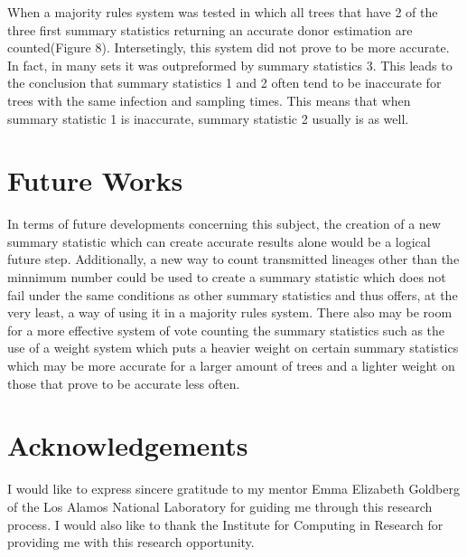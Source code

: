 \documentclass[final,5p,times,twocolumn,authoryear]{elsarticle}
\begin{document}
When a majority rules system was tested in which all trees that have 2 of the three first summary statistics returning an accurate donor estimation are counted(Figure 8). Intersetingly, this system did not prove to be more accurate. In fact, in many sets it was outpreformed by summary statistics 3. This leads to the conclusion that summary statistics 1 and 2 often tend to be inaccurate for trees with the same infection and sampling times. This means that when summary statistic 1 is inaccurate, summary statistic 2 usually is as well.

\section{Future Works}
\label{Future Works}
In terms of future developments concerning this subject, the creation of a new summary statistic which can create accurate results alone would be a logical future step. Additionally, a new way to count transmitted lineages other than the minnimum number could be used to create a summary statistic which does not fail under the same conditions as other summary statistics and thus offers, at the very least, a way of using it in a majority rules system. There also may be room for a more effective system of vote counting the summary statistics such as the use of a weight system which puts a heavier weight on certain summary statistics which may be more accurate for a larger amount of trees and a lighter weight on those that prove to be accurate less often.

\section{Acknowledgements}
\label{acknowledgements}
I would like to express sincere gratitude to my mentor Emma Elizabeth Goldberg of the Los Alamos National Laboratory for guiding me through this research process. I would also like to thank the Institute for Computing in Research for providing me with this research opportunity. 


 







\end{document}
